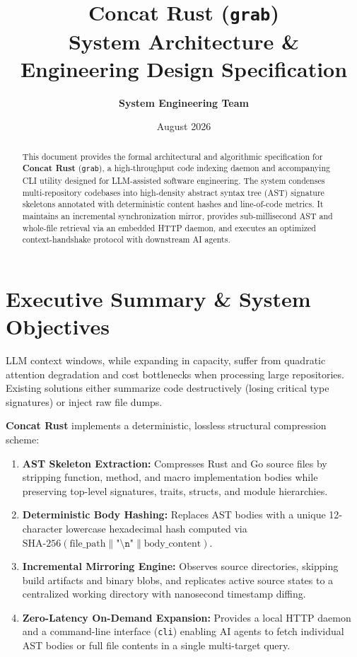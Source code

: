 \documentclass[11pt,a4paper]{article}
\title{\textbf{Concat Rust (\texttt{grab}) \\ System Architecture \& Engineering Design Specification}}
\author{\textbf{System Engineering Team}}
\date{August 2026}
\begin{document}
\maketitle

\begin{abstract}
This document provides the formal architectural and algorithmic specification for \textbf{Concat Rust} (\texttt{grab}), a high-throughput code indexing daemon and accompanying CLI utility designed for LLM-assisted software engineering. The system condenses multi-repository codebases into high-density abstract syntax tree (AST) signature skeletons annotated with deterministic content hashes and line-of-code metrics. It maintains an incremental synchronization mirror, provides sub-millisecond AST and whole-file retrieval via an embedded HTTP daemon, and executes an optimized context-handshake protocol with downstream AI agents.
\end{abstract}

\tableofcontents
\newpage

\section{Executive Summary \& System Objectives}
LLM context windows, while expanding in capacity, suffer from quadratic attention degradation and cost bottlenecks when processing large repositories. Existing solutions either summarize code destructively (losing critical type signatures) or inject raw file dumps.

\textbf{Concat Rust} implements a deterministic, lossless structural compression scheme:
\begin{enumerate}[leftmargin=*]
    \item \textbf{AST Skeleton Extraction:} Compresses Rust and Go source files by stripping function, method, and macro implementation bodies while preserving top-level signatures, traits, structs, and module hierarchies.
    \item \textbf{Deterministic Body Hashing:} Replaces AST bodies with a unique 12-character lowercase hexadecimal hash computed via $\text{SHA-256}(\text{file\_path} \parallel \texttt{"\textbackslash n"} \parallel \text{body\_content})$.
    \item \textbf{Incremental Mirroring Engine:} Observes source directories, skipping build artifacts and binary blobs, and replicates active source states to a centralized working directory with nanosecond timestamp diffing.
    \item \textbf{Zero-Latency On-Demand Expansion:} Provides a local HTTP daemon and a command-line interface (\texttt{cli}) enabling AI agents to fetch individual AST bodies or full file contents in a single multi-target query.
\end{enumerate}
\end{document}
